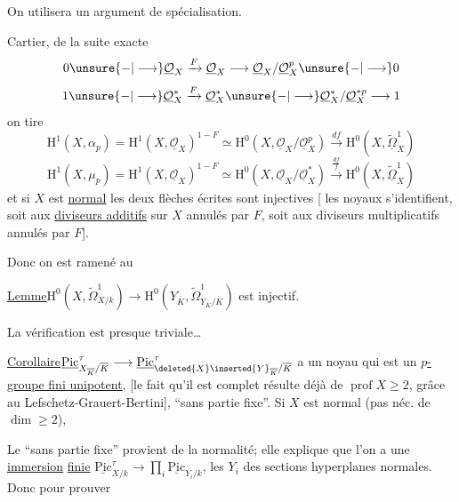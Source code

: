 
On utilisera un argument de spécialisation.

   Cartier, de la suite exacte
\[
0\unsure{{-}|\longrightarrow}\underline{\mathcal{O}}_X\xrightarrow{F}\underline{\mathcal{O}}_X\longrightarrow\underline{\mathcal{O}}_X/\underline{\mathcal{O}}_X^p\unsure{{-}|\longrightarrow}0
\]
\[
1\unsure{{-}|\longrightarrow}\underline{\mathcal{O}}_X^*\xrightarrow{F}\underline{\mathcal{O}}_X^*\unsure{{-}|\longrightarrow}\underline{\mathcal{O}}_X^*/\underline{\mathcal{O}}_X^{*p}\longrightarrow1
\]
 on tire
\[
\mathrm{H}^1(X,\alpha_p)=\mathrm{H}^1(X,\underline{\mathcal{O}}_X)^{1-F}\simeq\mathrm{H}^0(X,\underline{\mathcal{O}}_X/\underline{\mathcal{O}}_X^p)\xrightarrow{df}\mathrm{H}^0(X,\underline{\widetilde{\Omega}}^1_X)
\]
\[
\mathrm{H}^1(X,\mu_p)=\mathrm{H}^1(X,\underline{\mathcal{O}}_X)^{1-F}\simeq\mathrm{H}^0(X,\underline{\mathcal{O}}_X/\underline{\mathcal{O}}_X^*)\xrightarrow{\frac{df}{f}}\mathrm{H}^0(X,\underline{\widetilde{\Omega}}^1_X)
\]
et si $X$ est \uline{normal} les deux flèches écrites sont injectives [ les noyaux s'identifient, soit aux \uline{diviseurs additifs} sur $X$ annulés par $F$, soit aux diviseurs multiplicatifs annulés par $F$].

Donc on est ramené au

\uline{Lemme}\quad $\mathrm{H}^0(X,\widetilde{\Omega}^1_{X/k})\longrightarrow\mathrm{H}^0(Y_{\overline{K}},\widetilde{\Omega}^1_{Y_{\overline{K}}/\overline{K}})$ est injectif.

La vérification est presque triviale\ldots

\uline{Corollaire}\quad $\underline{\mathrm{Pic}}^\tau_{X_{\overline{K}}/\overline{K}}\longrightarrow\underline{\mathrm{Pic}}^\tau_{\deleted{X}\inserted{Y}_{\overline{K}}/\overline{K}}$ a un noyau qui est un \uline{$p$-groupe fini unipotent}, [le fait qu'il est complet résulte déjà de $\operatorname{prof}X\geq2$, grâce au  Lefschetz-Grauert-Bertini], ``sans partie fixe''. Si $X$ est normal (pas néc. de $\dim\geq2$), 

Le ``sans partie fixe'' provient de la normalité; elle explique que l'on a une \uline{immersion} \uline{finie} $\underline{\mathrm{Pic}}^\tau_{X/k}\longrightarrow\prod_i\underline{\mathrm{Pic}}_{Y_i/k}$, les $Y_i$ des sections hyperplanes  normales. Donc pour prouver
